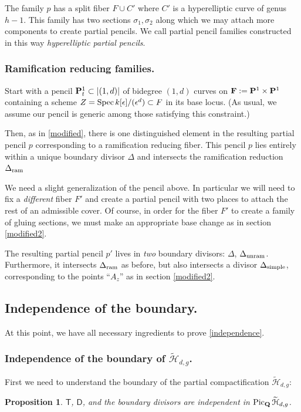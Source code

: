 \documentclass[reqno, 10 pt]{article}
\newtheorem{prop}[thm]{Proposition}
\theoremstyle{definition}
\theoremstyle{remark}
\numberwithin{equation}{section}
\numberwithin{thm}{section}
\numberwithin{prop}{section}
\numberwithin{lem}{section}
\numberwithin{cor}{section}
\numberwithin{conj}{section}
\numberwithin{defn}{section}
\renewcommand{\H}{\mathcal H}
\newcommand{\F}{{\mathbf F}}
\newcommand{\sfT}{{\mathsf T}}
\newcommand{\sfD}{{\mathsf D}}
\newcommand {\Q}{{\bf Q}}
\renewcommand{\P}{{\bf P}}
\renewcommand{\F}{{\bf F}}
\renewcommand{\H}{{\mathcal{H}}}
\newcommand{\Spec}{{\text{\rm Spec}\,}}
\begin{document}
    The family $p$ has a split fiber $F \cup C'$ where $C'$ is a hyperelliptic curve of genus $h-1$.  This family has two sections $\sigma_{1}, \sigma_{2}$ along which we may attach more components to create partial pencils. We call partial pencil families constructed in this way {\sl hyperelliptic partial pencils}. 

 \subsubsection{Ramification reducing families.}\label{reducefamilies} 

    

    Start with a pencil $\P^{1}_{t} \subset |(1,d)|$ of bidegree $(1,d)$ curves on $\F := \P^{1} \times \P^{1}$ containing a scheme $Z = \Spec k[\epsilon]/(\epsilon^{d}) \subset F$ in its base locus. (As usual, we assume our pencil is generic among those satisfying this constraint.) 

    Then, as in \autoref{modified}, there is one distinguished element in the resulting partial pencil $p$ corresponding to a ramification reducing fiber. This pencil $p$ lies entirely within a unique boundary divisor $\Delta$ and intersects the ramification reduction $\Delta_{{\rm ram}}$   

    We need a slight generalization of the pencil above.  In particular we will need to fix a {\sl different} fiber $F'$ and create a partial pencil with two places to attach the rest of an admissible cover. Of course, in order for the fiber $F'$ to create a family of gluing sections, we must make an appropriate base change as in section \ref{modified2}. 

    The resulting partial pencil $p'$ lives in {\sl two} boundary divisors: $\Delta$, $\Delta_{{\rm unram}}$.  Furthermore, it intersects $\Delta_{{\rm ram}}$ as before, but also intersects a divisor $\Delta_{{\rm simple}}$, corresponding to the points ``$A_{z}$'' as in section \ref{modified2}.

\subsection{Independence of the boundary.}
  At this point, we have all necessary ingredients to prove \autoref{independence}.
    
  \subsubsection{Independence of the boundary of $\widetilde{\H}_{d,g}$.}
    First we need to understand the boundary of the partial compactification $\widetilde{\H}_{d,g}$:
    \begin{prop}\label{indHtilde}
    $\sfT$, $\sfD$, and the boundary divisors are independent in ${\rm Pic}_{\Q}\,\widetilde{\H}_{d,g}$.  
    \end{prop}
\end{document}
